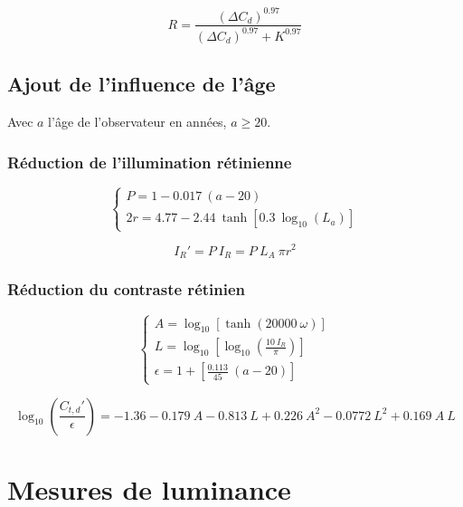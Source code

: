 	\begin{equation}
		R = \frac{(\Delta C_d)^{0.97}}{(\Delta C_d)^{0.97} + K^{0.97}}
		\label{eq:anxe_step_41}
	\end{equation}
	
	\section*{Ajout de l'influence de l'âge}	
	\par Avec $a$ l'âge de l'observateur en années, $a \geq 20$.	
	
	\subsection*{Réduction de l'illumination rétinienne}
	\begin{equation}
		\begin{cases}
		P = 1 - 0.017~(a - 20)\\
		2r = 4.77 - 2.44~\tanh[0.3~\log_{10}(L_a)]
		\end{cases}
		\label{eq:anxe_step_50}
	\end{equation}
	
	\begin{equation}
		I_R' = P~I_R = P~L_A~\pi r^2
		\label{eq:anxe_step_51}
	\end{equation}
	
	\subsection*{Réduction du contraste rétinien}
	\begin{equation}
		\begin{cases}
		A = \log_{10} \left[ \tanh(20000~\omega) \right]\\
		L = \log_{10} \left[ \log_{10} \left( \frac{10~I_R}{\pi} \right) \right]\\
		\epsilon = 1 + \left[ \frac{0.113}{45}~(a - 20) \right]
		\end{cases}
		\label{eq:anxe_step_50}
	\end{equation}
	
	\begin{equation}
		\log_{10} \left( \frac{C_{t,d}'}{\epsilon} \right) = -1.36 -0.179~A - 0.813~L + 0.226~A^2 - 0.0772~L^2 + 0.169~A~L
		\label{eq:anxe_step_51}
	\end{equation}
	
	\chapter*{Mesures de luminance}
	
